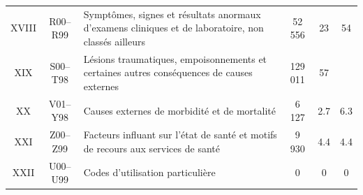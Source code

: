 \documentclass[12pt,english,french,twoside]{book}\usepackage[]{graphicx}\usepackage[]{color}
\begin{document}
\begin{longtable}{|c|c|m{4cm}|c|c|c|}

XVIII&R00–R99&Symptômes, signes et résultats anormaux d'examens cliniques et de laboratoire, non classés ailleurs&52 556&23&54\\

XIX&S00–T98&Lésions traumatiques, empoisonnements et certaines autres conséquences de causes externes&129 011&57& \\

XX&V01–Y98&Causes externes de morbidité et de mortalité& 6 127&2.7&6.3\\

XXI&Z00–Z99&Facteurs influant sur l'état de santé et motifs de recours aux services de santé&9 930&4.4&4.4\\

XXII&U00–U99&Codes d'utilisation particulière & 0&0&0\\

  \hline
\end{longtable}
\end{document}
